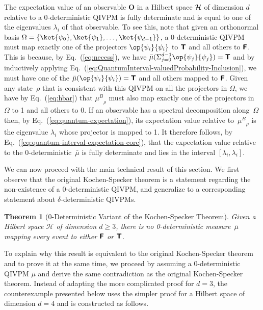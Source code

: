 \documentclass[english,reprint, aps, prl,superscriptaddress, showpacs,
showkeys, longbibliography, amsmath, amssymb, floatfix]{revtex4-1}
\theoremstyle{plain}
\newtheorem{thm}{Theorem}
\theoremstyle{definition}
\newcommand{\Hilb}{\mathcal{H}}
\newcommand{\interval}[1]{{\normalfont\textsf{\textbf{#1}}}}
\newcommand{\imposs}{\interval{F}}
\newcommand{\necess}{\interval{T}}
\newcommand{\proj}[1]{\op{#1}{#1}}
\newcommand{\muB}{\ensuremath{\mu^{B}}}
\begin{document}
The expectation value of an observable $\mathbf{O}$ in a Hilbert space
${\cal H}$ of dimension $d$ relative to a 0-deterministic QIVPM is
fully determinate and is equal to one of the eigenvalues $\lambda_i$
of that observable. To see this, note that given an orthonormal basis
$\Omega=\{ \ket{\psi_0},\ket{\psi_1},\ldots,\ket{\psi_{d-1}}\}$, a
0-deterministic QIVPM must map exactly one of the projectors
$\proj{\psi_i}$ to $\necess$ and all others to $\imposs$. This is
because, by Eq.~(\ref{eq:necess}), we have
$\bar{\mu}(\Sigma_{j=0}^{d-1}{\proj{\psi_j}})=\necess$ and by
inductively applying
Eq.~(\ref{eq:QuantumInterval-valuedProbability-Inclusion}), we must
have one of the $\bar{\mu}(\proj{\psi_i})=\necess$ and all others
mapped to $\imposs$. Given any state~$\rho$ that is consistent with
this QIVPM on all the projectors in $\Omega$, we have by
Eq.~(\ref{eq:hbar}) that $\muB_{\rho}$ must also map exactly one of
the projectors in $\Omega$ to 1 and all others to 0. If an observable
has a spectral decomposition along~$\Omega$ then, by
Eq.~(\ref{eq:quantum-expectation}), its expectation value relative
to~$\muB_{\rho}$ is the eigenvalue $\lambda_i$ whose projector is
mapped to 1. It therefore follows, by
Eq.~(\ref{eq:quantum-interval-expectation-core}), that the expectation
value relative to the 0-deterministic~${\bar{\mu}}$ is fully
determinate and lies in the interval $[\lambda_i,\lambda_i]$.

We can now proceed with the main technical result of this section. We
first observe that the original Kochen-Specker theorem is a statement
regarding the non-existence of a $0$-deterministic QIVPM, and
generalize to a corresponding statement about $\delta$-deterministic QIVPMs.

\begin{thm}[0-Deterministic Variant of the Kochen-Specker
  Theorem] \label{thm:Kochen-Specker} Given a Hilbert space $\Hilb$ of
  dimension $d\ge3$, there is no 0-deterministic measure~$\bar{\mu}$
  mapping every event to either $\imposs$ or $\necess$.
\end{thm}

\noindent To explain why this result is equivalent to the original
Kochen-Specker theorem and to prove it at the same time, we proceed by
assuming a 0-deterministic QIVPM $\bar{\mu}$ and derive the same
contradiction as the original Kochen-Specker theorem. Instead of
adapting the more complicated proof for $d=3$, the counterexample
presented below uses the simpler proof for a Hilbert space of
dimension $d=4$ and is constructed as follows.
\end{document}
